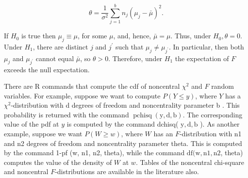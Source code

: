 \begin{equation*}
\theta=\frac{1}{\sigma^{2}} \sum_{j=1}^{b} n_{j}\left(\mu_{j}-\bar{\mu}\right)^{2} . \tag{9.3.5}
\end{equation*}


If $H_{0}$ is true then $\mu_{j} \equiv \mu$, for some $\mu$, and, hence, $\bar{\mu}=\mu$. Thus, under $H_{0}, \theta=0$. Under $H_{1}$, there are distinct $j$ and $j^{\prime}$ such that $\mu_{j} \neq \mu_{j^{\prime}}$. In particular, then both $\mu_{j}$ and $\mu_{j^{\prime}}$ cannot equal $\bar{\mu}$, so $\theta>0$. Therefore, under $H_{1}$ the expectation of $F$ exceeds the null expectation.

There are R commands that compute the cdf of noncentral $\chi^{2}$ and $F$ random variables. For example, suppose we want to compute $P(Y \leq y)$, where $Y$ has a $\chi^{2}$-distribution with d degrees of freedom and noncentrality parameter b . This probability is returned with the command $\operatorname{pchisq}(\mathrm{y}, \mathrm{d}, \mathrm{b})$. The corresponding value of the pdf at $y$ is computed by the command dchisq( $\mathrm{y}, \mathrm{d}, \mathrm{b}$ ). As another example, suppose we want $P(W \geq w)$, where $W$ has an $F$-distribution with n1 and n2 degrees of freedom and noncentrality parameter theta. This is computed by the command 1-pf (w, n1, n2, theta), while the command $\mathrm{df}(\mathrm{w}, \mathrm{n} 1, \mathrm{n} 2$, theta) computes the value of the density of $W$ at $w$. Tables of the noncentral chi-square and noncentral $F$-distributions are available in the literature also.

